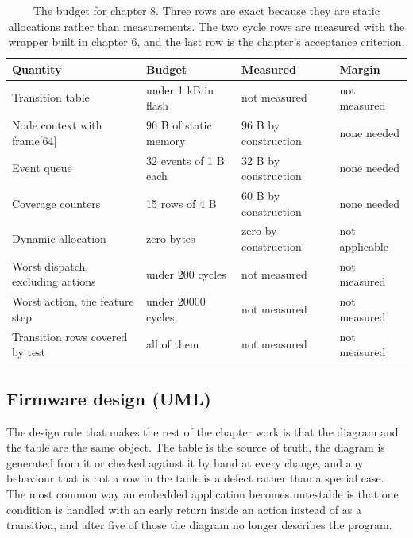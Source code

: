 
\begin{table}[H]\centering\small
\begin{tabular}{p{44mm}p{28mm}p{28mm}p{30mm}}
\toprule
Quantity & Budget & Measured & Margin \\
\midrule
Transition table & under 1 kB in flash & not measured & not measured \\
Node context with frame[64] & 96 B of static memory & 96 B by construction & none needed \\
Event queue & 32 events of 1 B each & 32 B by construction & none needed \\
Coverage counters & 15 rows of 4 B & 60 B by construction & none needed \\
Dynamic allocation & zero bytes & zero by construction & not applicable \\
Worst dispatch, excluding actions & under 200 cycles & not measured & not measured \\
Worst action, the feature step & under 20000 cycles & not measured & not measured \\
Transition rows covered by test & all of them & not measured & not measured \\
\bottomrule
\end{tabular}
\caption{The budget for chapter 8. Three rows are exact because they are static allocations rather than measurements. The two cycle rows are measured with the wrapper built in chapter 6, and the last row is the chapter's acceptance criterion.}
\end{table}

\subsection*{Firmware design (UML)}


The design rule that makes the rest of the chapter work is that the diagram and
the table are the same object. The table is the source of truth, the diagram is
generated from it or checked against it by hand at every change, and any
behaviour that is not a row in the table is a defect rather than a special
case. The most common way an embedded application becomes untestable is that
one condition is handled with an early return inside an action instead of as a
transition, and after five of those the diagram no longer describes the
program.

